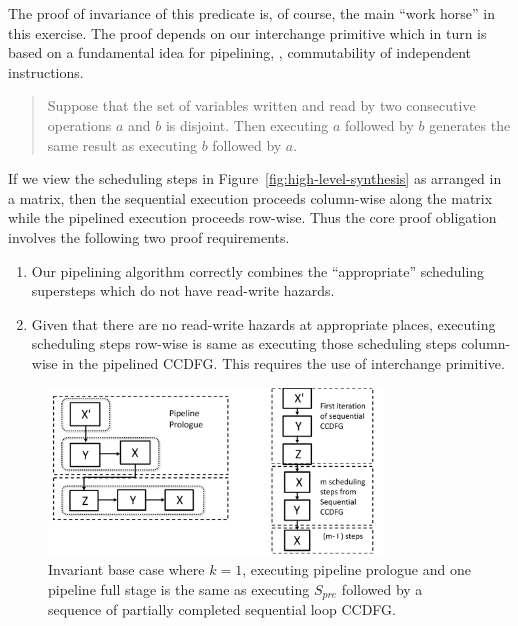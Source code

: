 The proof of invariance of this predicate is, of course, the
main ``work horse'' in this exercise.  The proof depends on
our interchange primitive which in turn is based on a fundamental idea for pipelining,
\viz, commutability of
independent instructions.

\begin{quote}
Suppose that the
set of variables written and read by two consecutive
operations $a$ and $b$ is disjoint.  Then executing $a$
followed by $b$ generates the same result as executing $b$
followed by $a$.
\end{quote}

If we view the scheduling steps in
Figure~\ref{fig:high-level-synthesis} as arranged in a
matrix, then the sequential execution proceeds column-wise
along the matrix while the pipelined execution proceeds
row-wise.  Thus the core proof obligation involves the
following two proof requirements.

\begin{enumerate}[--]
\item Our pipelining algorithm correctly combines the
  ``appropriate'' scheduling supersteps which do not have
  read-write hazards.
\item Given that there are no read-write hazards at
  appropriate places, executing scheduling steps row-wise is
  same as executing those scheduling steps column-wise in
  the pipelined CCDFG.  This requires the use of interchange primitive.
\end{enumerate}

\begin{figure}[t!]
\begin{center}
\includegraphics[width=3.5in]{fig-proposal/invariant-base-case}
\end{center}
\caption{Invariant base case where $k = 1$, executing
  pipeline prologue and one pipeline full stage is the same
  as executing $S_{pre}$ followed by a sequence of partially
  completed sequential loop CCDFG.}
\label{fig:invariant-base-case}
\end{figure}

